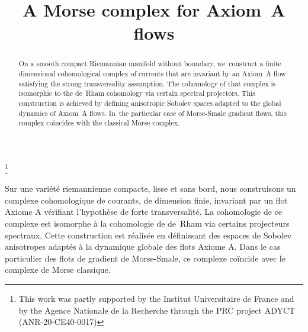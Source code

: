 \documentclass[JEP,XML,SOM,Unicode,NoEqCountersInSection,NoFloatCountersInSection,published]{cedram}
\theoremstyle{definition}
\theoremstyle{plain}
\begin{document}
\frontmatter

\title{A Morse complex for Axiom~A flows}

\author[\initial{A.} \lastname{Meddane}]{ }
\address{Laboratoire de mathématiques Jean Leray (UMR CNRS 6629), Université de Nantes,\\
2 rue de la Houssinière, BP92208, 44322 Nantes Cédex 3, France}

\thanks{This work was partly supported by the Institut Universitaire de France and by the Agence Nationale de la Recherche through the PRC project ADYCT (ANR-20-CE40-0017)}

\begin{abstract}
On a smooth compact Riemannian manifold without boundary, we~construct a finite dimensional cohomological complex of currents that are invariant by an Axiom~A flow satisfying the strong transversality assumption. The cohomology of that complex is isomorphic to the de~Rham cohomology via certain spectral projectors. This construction is achieved by defining anisotropic Sobolev spaces adapted to the global dynamics of Axiom~A flows. In~the particular case of Morse-Smale gradient flows, this complex coincides with the classical Morse complex.
\end{abstract}




\begin{altabstract}
Sur une variété riemannienne compacte, lisse et sans bord, nous construisons un complexe cohomologique de courants, de dimension finie, invariant par un flot Axiome A vérifiant l'hypothèse de forte transversalité. La cohomologie de ce complexe est isomorphe à la cohomologie de de~Rham via certains projecteurs spectraux. Cette construction est réalisée en définissant des espaces de Sobolev anisotropes adaptés à la dynamique globale des flots Axiome A. Dans le cas particulier des flots de gradient de Morse-Smale, ce complexe coïncide avec le complexe de Morse classique.
\end{altabstract}
\end{document}
